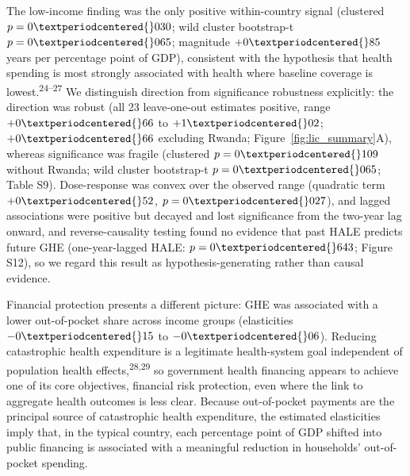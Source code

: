 \documentclass[12pt,a4paper]{article}
\begin{document}
The low-income finding was the only positive within-country signal (clustered $p = 0{\textperiodcentered{}}030$; wild cluster bootstrap-t $p = 0{\textperiodcentered{}}065$; magnitude $+0{\textperiodcentered{}85}$ years per percentage point of GDP), consistent with the hypothesis that health spending is most strongly associated with health where baseline coverage is lowest.\textsuperscript{24--27} We distinguish direction from significance robustness explicitly: the direction was robust (all 23 leave-one-out estimates positive, range $+0{\textperiodcentered{}}66$ to $+1{\textperiodcentered{}}02$; $+0{\textperiodcentered{}}66$ excluding Rwanda; Figure~\ref{fig:lic_summary}A), whereas significance was fragile (clustered $p = 0{\textperiodcentered{}}109$ without Rwanda; wild cluster bootstrap-t $p = 0{\textperiodcentered{}}065$; Table S9). Dose-response was convex over the observed range (quadratic term $+0{\textperiodcentered{}}52$, $p = 0{\textperiodcentered{}}027$), and lagged associations were positive but decayed and lost significance from the two-year lag onward, and reverse-causality testing found no evidence that past HALE predicts future GHE (one-year-lagged HALE: $p = 0{\textperiodcentered{}}643$; Figure S12), so we regard this result as hypothesis-generating rather than causal evidence.

Financial protection presents a different picture: GHE was associated with a lower out-of-pocket share across income groups (elasticities $-0{\textperiodcentered{}}15$ to $-0{\textperiodcentered{}}06$). Reducing catastrophic health expenditure is a legitimate health-system goal independent of population health effects,\textsuperscript{28,29} so government health financing appears to achieve one of its core objectives, financial risk protection, even where the link to aggregate health outcomes is less clear. Because out-of-pocket payments are the principal source of catastrophic health expenditure, the estimated elasticities imply that, in the typical country, each percentage point of GDP shifted into public financing is associated with a meaningful reduction in households' out-of-pocket spending.
\end{document}
